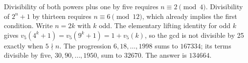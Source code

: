 Divisibility of both powers plus one by five requires $n\equiv2\pmod4$. Divisibility of $2^n+1$ by thirteen requires $n\equiv6\pmod{12}$, which already implies the first condition. Write $n=2k$ with $k$ odd. The elementary lifting identity for odd $k$ gives $v_5(4^k+1)=v_5(9^k+1)=1+v_5(k)$, so the gcd is not divisible by 25 exactly when $5\nmid n$. The progression $6,18,\ldots,1998$ sums to $167334$; its terms divisible by five, $30,90,\ldots,1950$, sum to $32670$. The answer is $\boxed{134664}$.
